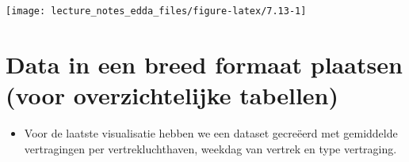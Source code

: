 \documentclass[]{memoir}
\providecommand{\tightlist}{%
  \setlength{\itemsep}{0pt}\setlength{\parskip}{0pt}}
\begin{document}
\texttt{[image: lecture\_notes\_edda\_files/figure-latex/7.13-1]}

\section{Data in een breed formaat plaatsen (voor overzichtelijke
tabellen)}\label{data-in-een-breed-formaat-plaatsen-voor-overzichtelijke-tabellen}

\begin{itemize}
\tightlist
\item
  Voor de laatste visualisatie hebben we een dataset gecreëerd met
  gemiddelde vertragingen per vertrekluchthaven, weekdag van vertrek en
  type vertraging.
\end{itemize}

\begin{table}[t]


\end{table}
\end{document}
